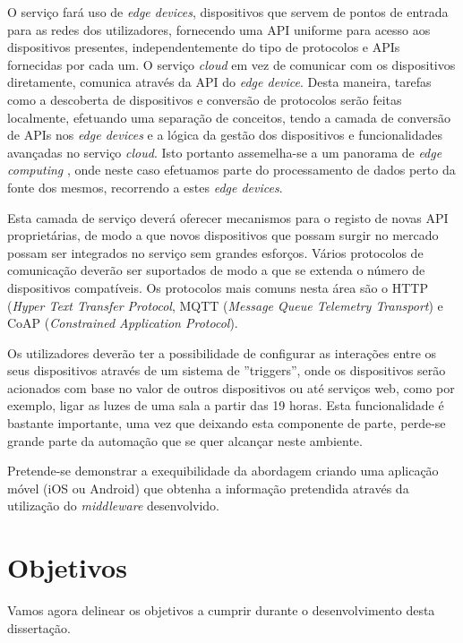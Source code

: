 O serviço fará uso de \textit{edge devices}, dispositivos que servem de pontos de entrada para as redes dos utilizadores, fornecendo uma API uniforme para acesso aos dispositivos presentes, independentemente do tipo de protocolos e APIs fornecidas por cada um. O serviço \textit{cloud} em vez de comunicar com os dispositivos diretamente, comunica através da API do \textit{edge device}. Desta maneira, tarefas como a descoberta de dispositivos e conversão de protocolos serão feitas localmente, efetuando uma separação de conceitos, tendo a camada de conversão de APIs nos \textit{edge devices} e a lógica da gestão dos dispositivos e funcionalidades avançadas no serviço \textit{cloud}. Isto portanto assemelha-se a um panorama de \textit{edge computing} \cite{edge}, onde neste caso efetuamos parte do processamento de dados perto da fonte dos mesmos, recorrendo a estes \textit{edge devices}.

Esta camada de serviço deverá oferecer mecanismos para o registo de novas API proprietárias, de modo a que novos dispositivos que possam surgir no mercado possam ser integrados no serviço sem grandes esforços. Vários protocolos de comunicação deverão ser suportados de modo a que se extenda o número de dispositivos compatíveis. Os protocolos mais comuns nesta área são o HTTP (\textit{Hyper Text Transfer Protocol}, MQTT (\textit{Message Queue Telemetry Transport}) e CoAP (\textit{Constrained Application Protocol}).

Os utilizadores deverão ter a possibilidade de configurar as interações entre os seus dispositivos através de um sistema de ''triggers'', onde os dispositivos serão acionados com base no valor de outros dispositivos ou até serviços web, como por exemplo, ligar as luzes de uma sala a partir das 19 horas. Esta funcionalidade é bastante importante, uma vez que deixando esta componente de parte, perde-se grande parte da automação que se quer alcançar neste ambiente.

Pretende-se demonstrar a exequibilidade da abordagem criando uma aplicação móvel (iOS ou Android) que obtenha a informação pretendida através da utilização do \textit{middleware} desenvolvido.

\newpage

\section{Objetivos}

Vamos agora delinear os objetivos a cumprir durante o desenvolvimento desta dissertação.


